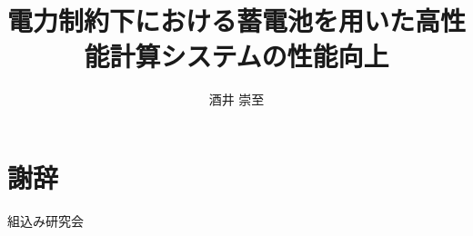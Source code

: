 \documentclass[ipc]{suribt}
\title{電力制約下における蓄電池を用いた高性能計算システムの性能向上}
\author{酒井 崇至}
\begin{document}
\maketitle%

\frontmatter%
\begin{abstract}%

\end{abstract}

\tableofcontents%

\mainmatter%










\backmatter%
\chapter{謝辞}%

\begin{thepublication}{9}
組込み研究会
\end{thepublication}

\appendix%
\chapter{}
\end{document}
